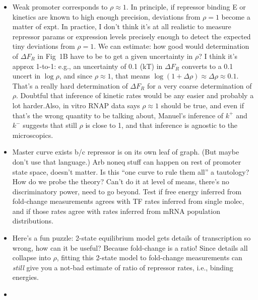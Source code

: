 \documentclass[12pt]{article}%
\begin{document}
{\begin{itemize}
other pictures would respond.
In theory you could refit their raw data to different models, but
as we see later, even having data of full mRNA distributions is
insufficient to identify parameters in all but the simplest of
the models in Figs.\ 1 and 2, so it seems doubtful that only
measurements of means would fare better.
??Double check, what did they actually measure in 2012 paper??
\item Weak promoter corresponds to $\rho\approx 1$. In principle,
if repressor binding E or kinetics are known to high enough
precision, deviations from $\rho=1$ become a matter of expt. In
practice, I don't think it's at all realistic to measure
repressor params or expression levels precisely enough to detect
the expected tiny deviations from $\rho=1$. We can estimate: how
good would determination of $\Delta F_R$ in Fig~1B have to be to
get a given uncertainty in $\rho$? I think it's approx 1-to-1:
e.g., an uncertainty of 0.1 (kT) in $\Delta F_R$ converts to a
0.1 uncert in $\log\rho$, and since $\rho\approx 1$, that means
$\log(1+\Delta\rho)\approx\Delta\rho\approx 0.1$.
That's a really hard determination of $\Delta F_R$ for a very
coarse determination of $\rho$. Doubtful that inference of
kinetic rates would be any easier and probably a lot harder.Also,
in vitro RNAP data says $\rho\approx 1$ should be true, and even
if that's the wrong quantity to be talking about, Manuel's
inference of $k^+$ and $k^-$ suggests that still $\rho$ is close
to 1, and that inference is agnostic to the microscopics.
\item Master curve exists b/c repressor is on its own leaf of
graph. (But maybe don't use that language.) Arb noneq stuff can
happen on rest of promoter state space, doesn't matter. Is this
``one curve to rule them all'' a tautology? How do we probe the
theory? Can't do it at level of means, there's no discriminatory
power, need to go beyond. Test if free energy inferred from
fold-change measurements agrees with TF rates inferred from
single molec, and if those rates agree with rates inferred from
mRNA population distributions.
\item Here's a fun puzzle: 2-state equilibrium model gets details
of transcription so wrong, how can it be useful? Because
fold-change is a ratio! Since details all collapse into $\rho$,
fitting this 2-state model to fold-change measurements can
\textit{still} give you a not-bad estimate of ratio of repressor
rates, i.e., binding energies.
\item 
\end{itemize}
}
\end{document}
